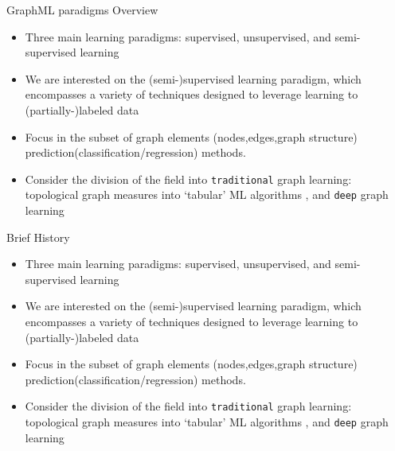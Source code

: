 \begin{frame}{GraphML paradigms Overview}
    \begin{itemize}
        \item Three main learning paradigms: supervised, unsupervised, and semi-supervised learning
        \item We are interested on the (semi-)supervised learning paradigm, which encompasses a variety of techniques designed to leverage learning to (partially-)labeled data \cite{verri2018advantages,amanciof}
        \item  Focus in the subset of graph elements (nodes,edges,graph structure) prediction(classification/regression) methods.
        \item Consider the division of the field into \texttt{traditional} graph learning: topological graph measures into `tabular' ML algorithms  \cite{costa2007characterization, silva2016machine}, and \texttt{deep} graph learning
    \end{itemize}
\end{frame}

\begin{frame}{Brief History}
    \begin{itemize}
        \item Three main learning paradigms: supervised, unsupervised, and semi-supervised learning
        \item We are interested on the (semi-)supervised learning paradigm, which encompasses a variety of techniques designed to leverage learning to (partially-)labeled data \cite{verri2018advantages,amanciof}
        \item  Focus in the subset of graph elements (nodes,edges,graph structure) prediction(classification/regression) methods.
        \item Consider the division of the field into \texttt{traditional} graph learning: topological graph measures into `tabular' ML algorithms  \cite{costa2007characterization, silva2016machine}, and \texttt{deep} graph learning
    \end{itemize}
\end{frame}

